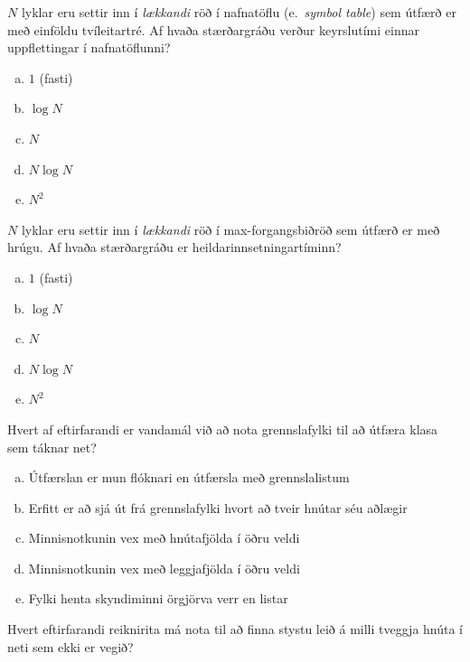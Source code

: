 \documentclass[addpoints]{exam}
\newcommand{\eng}[1]{(e.\ \emph{#1})}
\begin{document}
\begin{questions}
	\question[3]
	$N$ lyklar eru settir inn í \emph{lækkandi} röð í nafnatöflu \eng{symbol table} sem útfærð er með einföldu tvíleitartré. Af hvaða stærðargráðu verður keyrslutími einnar uppflettingar í nafnatöflunni?

	\begin{multicols}{5}
		\begin{enumerate}[a)]
			\item $1$ (fasti)
			\item $\log N$
			\item $N$
			\item $N\log N$
			\item $N^2$
		\end{enumerate}
	\end{multicols}

	\question[3]
	$N$ lyklar eru settir inn í \emph{lækkandi} röð í max-forgangsbiðröð sem útfærð er með hrúgu. Af hvaða stærðargráðu er heildarinnsetningartíminn?

	\begin{multicols}{5}
		\begin{enumerate}[a)]
			\item $1$ (fasti)
			\item $\log N$
			\item $N$
			\item $N\log N$
			\item $N^2$
		\end{enumerate}
	\end{multicols}

	\question[3]

	Hvert af eftirfarandi er vandamál við að nota grennslafylki til að útfæra klasa sem táknar net?

	\begin{enumerate}[a)]
		\item Útfærslan er mun flóknari en útfærsla með grennslalistum
		\item Erfitt er að sjá út frá grennslafylki hvort að tveir hnútar séu aðlægir
		\item Minnisnotkunin vex með hnútafjölda í öðru veldi
		\item Minnisnotkunin vex með leggjafjölda í öðru veldi
		\item Fylki henta skyndiminni örgjörva verr en listar
	\end{enumerate}

	\question[3]

	Hvert eftirfarandi reiknirita má nota til að finna stystu leið á milli tveggja hnúta í neti sem ekki er vegið?


\end{questions}
\end{document}

